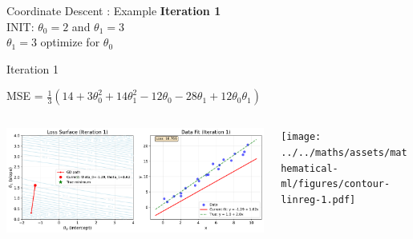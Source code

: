 \documentclass{beamer}
\begin{document}
\begin{frame}{Coordinate Descent : Example}
\textbf{Iteration 1}\\
\vspace{0.5cm}
INIT: $\theta_{0} = 2$ and  $\theta_{1}  = 3$\\

\vspace{0.5cm}
$\theta_1 = 3$ optimize for $\theta_{0}$\\ 


\end{frame}


\begin{frame}{Iteration 1}

MSE = $\frac{1}{3}(14+3\theta_{0}^{2}+14\theta_{1}^{2}-12\theta_{0}-28\theta_{1}+12\theta_{0}\theta_{1})$\\

\begin{columns}
\begin{column}{0.6\textwidth}
\begin{adjustbox}{max totalsize={\textwidth},center}
\includegraphics[width=\textwidth]{../../maths/assets/mathematical-ml/figures/gradient-descent-1.pdf}
\end{adjustbox}

\end{column}
\begin{column}{0.5\textwidth}
\begin{adjustbox}{max totalsize={\textwidth},center}
\texttt{[image: ../../maths/assets/mathematical-ml/figures/contour-linreg-1.pdf]}
\end{adjustbox}
\end{column}
\end{columns}


\end{frame}
\end{document}
